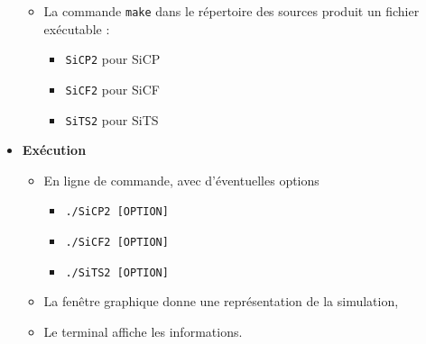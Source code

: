 \begin{itemize}[leftmargin=1cm, label=, itemsep=0pt]
\begin{itemize}[leftmargin=1cm, label=, itemsep=0pt]
	\item La commande \texttt{make} dans le répertoire des sources produit un fichier exécutable :
		\begin{itemize}[leftmargin=1cm, label=, itemsep=0pt]
		\item \texttt{SiCP2} pour SiCP
		\item \texttt{SiCF2} pour SiCF
		\item \texttt{SiTS2} pour SiTS
		\end{itemize}
	\end{itemize}
%
\item {\bf Exécution}
	\begin{itemize}[leftmargin=1cm, label=, itemsep=0pt]
	\item En ligne de commande, avec d'éventuelles options
		\begin{itemize}[leftmargin=1cm, label=, itemsep=0pt]
		\item \texttt{./SiCP2 [OPTION]}
		\item \texttt{./SiCF2 [OPTION]}
		\item \texttt{./SiTS2 [OPTION]}
		\end{itemize}
	\item La fenêtre graphique donne une représentation de la simulation,
	\item Le terminal affiche les informations.
	\end{itemize}
\end{itemize}

